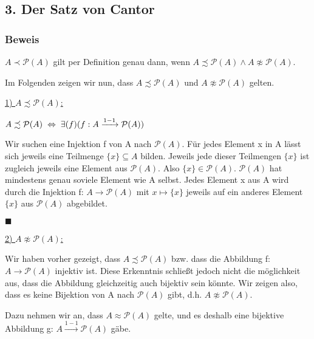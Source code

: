 \documentclass[12pt]{article}
\begin{document}
		\subsection*{3. Der Satz von Cantor}
		
		
		\subsubsection*{Beweis}
		
		$A \prec \mathcal{P}(A)$ gilt per Definition genau dann, wenn 
		$A \precsim \mathcal{P}(A) \land A \not \approx \mathcal{P}(A)$.
		
		Im Folgenden zeigen wir nun, dass $A \precsim \mathcal{P}(A)$ und 
		$A \not \approx \mathcal{P}(A)$ gelten.
		
		\underline{1) $A \precsim \mathcal{P}(A)$:}
		
		$A \precsim \mathcal{P}(A) \hspace*{1mm} \Leftrightarrow \hspace*{1mm} \exists (f) (f: A \xrightarrow{1-1} \mathcal{P}(A))$
		
		Wir suchen eine Injektion f von A nach $\mathcal{P}(A)$.
		Für jedes Element x in A lässt sich jeweils eine Teilmenge $\{x\} \subseteq A$ bilden.
		Jeweils jede dieser Teilmengen $\{x\}$ ist zugleich jeweils eine Element aus $\mathcal{P}(A)$.
		Also $\{x\} \in \mathcal{P}(A)$.
		$\mathcal{P}(A)$ hat mindestens genau soviele Element wie A selbst. 
		Jedes Element x aus A wird durch die Injektion f: $A \rightarrow \mathcal{P}(A)$ mit
		$x \mapsto \{x\}$ jeweils auf ein anderes Element $\{x\}$ aus $\mathcal{P}(A)$ abgebildet.
		
		$\blacksquare$
		
		\underline{2) $A \not \approx \mathcal{P}(A)$:}
		
		Wir haben vorher gezeigt, dass $A \precsim \mathcal{P}(A)$ bzw. dass die Abbildung 
		f: $A \rightarrow \mathcal{P}(A)$ injektiv ist.
		Diese Erkenntnis schließt jedoch nicht die möglichkeit aus, dass die Abbildung 
		gleichzeitig auch bijektiv sein könnte.
		Wir zeigen also, dass es keine Bijektion von A nach $\mathcal{P}(A)$ gibt,
		d.h. $A \not \approx \mathcal{P}(A)$.
		
		Dazu nehmen wir an, dass $A \approx \mathcal{P}(A)$ gelte, und es deshalb eine
		bijektive Abbildung g: $A \xrightarrow{1-1} \mathcal{P}(A)$ gäbe.
		
\end{document}

